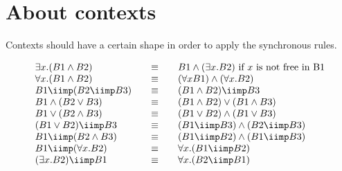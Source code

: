 \documentclass{llncs}
\begin{document}
\section{About contexts}\label{sec:cont}
Contexts should have a certain shape in order to apply the synchronous rules. 

\[
\begin{array}{lcl}
\exists x. (B1\wedge B2) & \quad\equiv \quad&  B1 \wedge  (\exists x. B2) \mbox{ if $x$ is not free in B1}\\
\forall x.(B1 \wedge  B2)  & \quad\equiv \quad&  (\forall x B1) \wedge  (\forall x. B2)\\
B1 \iimp(B2 \iimp B3)  & \equiv  & (B1 \wedge B2)\iimp B3\\
B1 \wedge (B2 \vee B3) & \equiv  & (B1 \wedge B2)\vee (B1 \wedge B3)\\
B1 \vee (B2 \wedge B3)  & \equiv  & (B1 \vee B2)\wedge (B1 \vee B3)\\
(B1 \vee B2)\iimp B3 & \equiv  & (B1 \iimp B3)\wedge (B2 \iimp B3)\\
B1 \iimp(B2 \wedge B3) &\equiv  & (B1 \iimp B2)\wedge (B1 \iimp B3)\\
B1 \iimp(\forall x. B2) & \equiv  & \forall x.(B1 \iimp B2)\\
 (\exists x.B2)\iimp B1 & \equiv &  \forall x.(B2 \iimp B1)
\end{array}
\]

\end{document}

